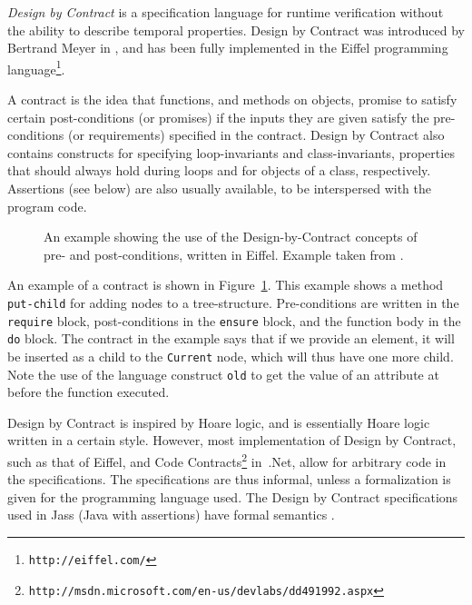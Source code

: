 \textit{Design by Contract} is a specification language for runtime
verification without the ability to describe temporal properties. Design by
Contract was introduced by Bertrand Meyer in \cite{meyer92applyingdbc}, and has
been fully implemented in the Eiffel programming
language\footnote{\texttt{http://eiffel.com/}}.

A contract is the idea that functions, and methods on objects, promise to
satisfy certain post-conditions (or promises) if the inputs they are given
satisfy the pre-conditions (or requirements) specified in the contract. Design
by Contract also contains constructs for specifying loop-invariants and
class-invariants, properties that should always hold during loops and for
objects of a class, respectively. Assertions (see below) are also usually
available, to be interspersed with the program code.

\begin{figure}[h!]
	\begin{center}
	\begin{minipage}{0.7\textwidth}
    \lstset{language=Eiffel}
		
	\end{minipage}
	\end{center}
  \caption{An example showing the use of the Design-by-Contract concepts of
    pre- and post-conditions, written in Eiffel. Example taken from
    \cite{meyer92applyingdbc}.}
	\label{figure-dbc-example}
\end{figure}

An example of a contract is shown in Figure~\ref{figure-dbc-example}. This
example shows a method \texttt{put-child} for adding nodes to a tree-structure.
Pre-conditions are written in the \texttt{require} block, post-conditions in
the \texttt{ensure} block, and the function body in the \texttt{do} block. The
contract in the example says that if we provide an element, it will be inserted
as a child to the \texttt{Current} node, which will thus have one more child.
Note the use of the language construct \texttt{old} to get the value of an
attribute at before the function executed.

Design by Contract is inspired by Hoare logic, and is essentially Hoare logic
written in a certain style. However, most implementation of Design by Contract,
such as that of Eiffel, and Code
Contracts\footnote{\texttt{http://msdn.microsoft.com/en-us/devlabs/dd491992.aspx}}
in~.Net, allow for arbitrary code in the specifications. The specifications are
thus informal, unless a formalization is given for the programming language
used. The Design by Contract specifications used in Jass (Java with assertions)
have formal semantics \cite{bartetzko01jass}.


